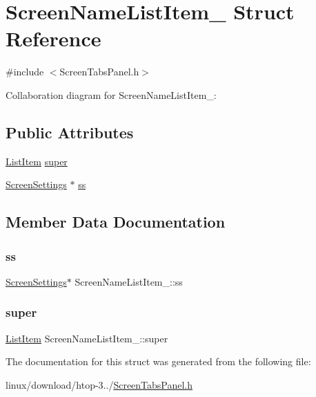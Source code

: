 \hypertarget{structScreenNameListItem__}{}\section{Screen\+Name\+List\+Item\+\_\+ Struct Reference}
\label{structScreenNameListItem__}


{\ttfamily \#include $<$Screen\+Tabs\+Panel.\+h$>$}



Collaboration diagram for Screen\+Name\+List\+Item\+\_\+\+:
\subsection*{Public Attributes}
\begin{DoxyCompactItemize}
\item 
\hyperlink{ListItem_8h_a311dfe5c572117175446997a9e6f15b8}{List\+Item} \hyperlink{structScreenNameListItem___a1873a2001ebb200cc025a79fc166448f}{super}
\item 
\hyperlink{Settings_8h_a86d3dc963e563d775d50b8cc2b77afb8}{Screen\+Settings} $\ast$ \hyperlink{structScreenNameListItem___a058efb67f25d5ff6d59075c55162025a}{ss}
\end{DoxyCompactItemize}


\subsection{Member Data Documentation}
\mbox{\label{structScreenNameListItem___a058efb67f25d5ff6d59075c55162025a}} 
\subsubsection{\texorpdfstring{ss}{ss}}
{\footnotesize\ttfamily \hyperlink{Settings_8h_a86d3dc963e563d775d50b8cc2b77afb8}{Screen\+Settings}$\ast$ Screen\+Name\+List\+Item\+\_\+\+::ss}

\mbox{\label{structScreenNameListItem___a1873a2001ebb200cc025a79fc166448f}} 
\subsubsection{\texorpdfstring{super}{super}}
{\footnotesize\ttfamily \hyperlink{ListItem_8h_a311dfe5c572117175446997a9e6f15b8}{List\+Item} Screen\+Name\+List\+Item\+\_\+\+::super}



The documentation for this struct was generated from the following file\+:\begin{DoxyCompactItemize}
\item 
linux/download/htop-\/3../\hyperlink{ScreenTabsPanel_8h}{Screen\+Tabs\+Panel.\+h}\end{DoxyCompactItemize}
